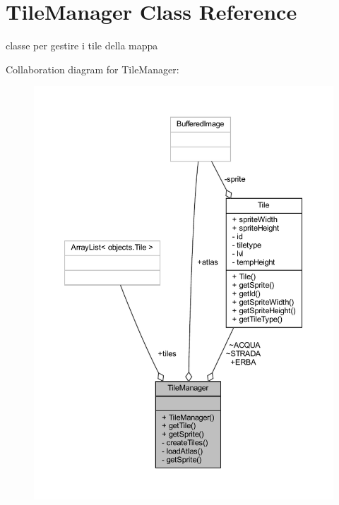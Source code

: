 \hypertarget{classmanagers_1_1_tile_manager}{}\section{Tile\+Manager Class Reference}
\label{classmanagers_1_1_tile_manager}


classe per gestire i tile della mappa  




Collaboration diagram for Tile\+Manager\+:
\nopagebreak
\begin{figure}[H]
\begin{center}
\leavevmode
\includegraphics[width=350pt]{classmanagers_1_1_tile_manager__coll__graph}
\end{center}
\end{figure}

